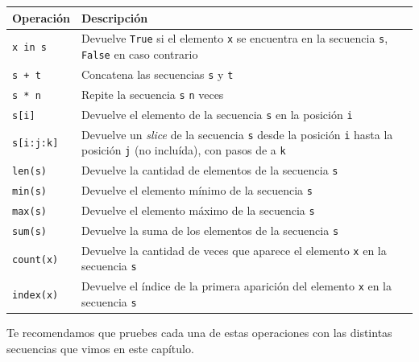 \documentclass[
  letterpaper,
  DIV=11,
  numbers=noendperiod]{scrreprt}
\begin{document}
\begin{longtable}[]{@{}
  >{\raggedright\arraybackslash}p{}
  >{\raggedright\arraybackslash}p{}@{}}
\toprule\noalign{}
\begin{minipage}[b]{\linewidth}\raggedright
Operación
\end{minipage} & \begin{minipage}[b]{\linewidth}\raggedright
Descripción
\end{minipage} \\
\midrule\noalign{}
\endhead
\bottomrule\noalign{}
\endlastfoot
\texttt{x\ in\ s} & Devuelve \texttt{True} si el elemento \texttt{x} se
encuentra en la secuencia \texttt{s}, \texttt{False} en caso
contrario~ \\
\texttt{s\ +\ t} & Concatena las secuencias \texttt{s} y \texttt{t} \\
\texttt{s\ *\ n} & Repite la secuencia \texttt{s} \texttt{n} veces \\
\texttt{s{[}i{]}} & Devuelve el elemento de la secuencia \texttt{s} en
la posición \texttt{i} \\
\texttt{s{[}i:j:k{]}} & Devuelve un \emph{slice} de la secuencia
\texttt{s} desde la posición \texttt{i} hasta la posición \texttt{j} (no
incluída), con pasos de a \texttt{k} \\
\texttt{len(s)} & Devuelve la cantidad de elementos de la secuencia
\texttt{s} \\
\texttt{min(s)} & Devuelve el elemento mínimo de la secuencia
\texttt{s} \\
\texttt{max(s)} & Devuelve el elemento máximo de la secuencia
\texttt{s} \\
\texttt{sum(s)} & Devuelve la suma de los elementos de la secuencia
\texttt{s} \\
\texttt{count(x)} & Devuelve la cantidad de veces que aparece el
elemento \texttt{x} en la secuencia \texttt{s} \\
\texttt{index(x)} & Devuelve el índice de la primera aparición del
elemento \texttt{x} en la secuencia \texttt{s} \\
\end{longtable}

\begin{tcolorbox}[enhanced jigsaw, opacitybacktitle=0.6, toptitle=1mm, toprule=.15mm, arc=.35mm, breakable, bottomrule=.15mm, opacityback=0, leftrule=.75mm, rightrule=.15mm, title=\textcolor{quarto-callout-tip-color}{\faLightbulb}\hspace{0.5em}{Tip}, left=2mm, bottomtitle=1mm, colframe=quarto-callout-tip-color-frame, colback=white, titlerule=0mm, coltitle=black, colbacktitle=quarto-callout-tip-color!10!white]

Te recomendamos que pruebes cada una de estas operaciones con las
distintas secuencias que vimos en este capítulo.

\end{tcolorbox}
\end{document}
